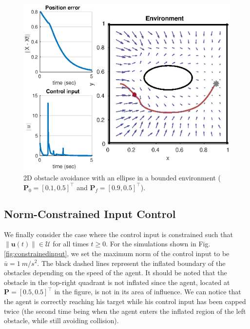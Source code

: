 \begin{figure}[H]
  \centering
  \includegraphics[width=1\linewidth]{img/walls2.eps}
  \caption{2D obstacle avoidance with an ellipse in a bounded environment ($\bm{P}_0 = [0.1,0.5]^\top$ and $\bm{P}_f = [0.9,0.5]^\top$).}
  \label{fig:walls}
\end{figure}

\subsection{Norm-Constrained Input Control}

We finally consider the case where the control input is constrained such that $\|\bm{u}(t)\| \in \mathcal{U}$ for all times $t\ge 0$. For the simulations shown in Fig. \ref{fig:constrainedinput}, we set the maximum norm of the control input to be $\bar{u} = \SI{1}{m/s^2}$. The black dashed lines represent the inflated boundary of the obstacles depending on the speed of the agent. It should be noted that the obstacle in the top-right quadrant is not inflated since the agent, located at $\bm{P} = [0.5,0.5]^\top$ in the figure, is not in its area of influence. We can notice that the agent is correctly reaching his target while his control input has been capped twice (the second time being when the agent enters the inflated region of the left obstacle, while still avoiding collision). 

